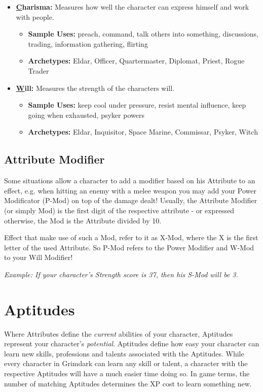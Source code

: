 \begin{itemize}
		\item {\large\textbf{\underline{C}harisma:}} Measures how well the character can express himself and work with people.
		\begin{itemize}
			\item \textbf{Sample Uses:} preach, command, talk others into something, discussions, trading, information gathering, flirting
			\item \textbf{Archetypes:} Eldar, Officer, Quartermaster, Diplomat, Priest, Rogue Trader
		\end{itemize}

		\item {\large\textbf{\underline{W}ill:}} Measures the strength of the characters will.
		\begin{itemize}
			\item \textbf{Sample Uses:} keep cool under pressure, resist mental influence, keep going when exhausted, psyker powers
			\item \textbf{Archetypes:} Eldar, Inquisitor, Space Marine, Commissar, Psyker, Witch
		\end{itemize}
	\end{itemize}


	\subsection{Attribute Modifier}
		Some situations allow a character to add a modifier based on his Attribute to an effect, e.g. when hitting an enemy with a melee weapon you may add your Power Modificator (P-Mod) on top of the damage dealt!
		Usually, the Attribute Modifier (or simply Mod) is the first digit of the respective attribute - or expressed otherwise, the Mod is the Attribute divided by 10. 

		Effect that make use of such a Mod, refer to it as X-Mod, where the X is the first letter of the used Attribute.
		So P-Mod refers to the Power Modifier and W-Mod to your Will Modifier!

		\textit{Example: If your character's Strength score is 37, then his S-Mod will be 3.}

\section{Aptitudes}\label{Aptitudes}
	Where Attributes define the \textit{current} abilities of your character, Aptitudes represent your character's \textit{potential}.
	Aptitudes define how easy your character can learn new skills, professions and talents associated with the Aptitudes.
	While every character in Grimdark can learn any skill or talent, a character with the respective Aptitudes will have a much easier time doing so.
	In game terms, the number of matching Aptitudes determines the XP cost to learn something new.

